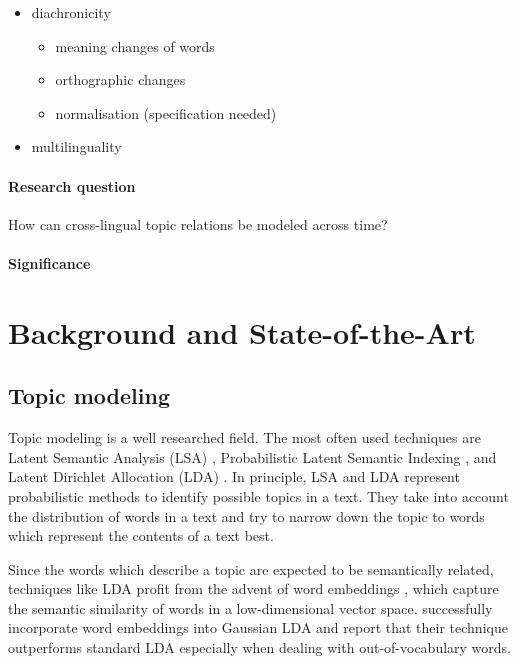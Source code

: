 \begin{itemize}
	\item diachronicity
	\begin{itemize}
		\item meaning changes of words
		\item orthographic changes
		\item normalisation (specification needed)
	\end{itemize}
	\item multilinguality
	
\end{itemize}

\paragraph{Research question}
How can cross-lingual topic relations be modeled across time?

\paragraph{Significance}

\section{Background and State-of-the-Art}

\subsection{Topic modeling}
Topic modeling is a well researched field. The most often used techniques are Latent Semantic Analysis (LSA) \citep{deerwesterscottindexing1990}, Probabilistic Latent Semantic Indexing \citep{hofmannprobabilistic1999}, and Latent Dirichlet Allocation (LDA) \citep{bleidynamic2006}. In principle, LSA and LDA represent probabilistic methods to identify possible topics in a text. They take into account the distribution of words in a text and try to narrow down the topic to words which represent the contents of a text best.

Since the words which describe a topic are expected to be semantically related, techniques like LDA profit from the advent of word embeddings \citep{mikolovdistributed2013,bengioneural2003}, which capture the semantic similarity of words in a low-dimensional vector space. \citet{dasgaussian2015} successfully incorporate word embeddings into Gaussian LDA and report that their technique outperforms standard LDA especially when dealing with out-of-vocabulary words.

